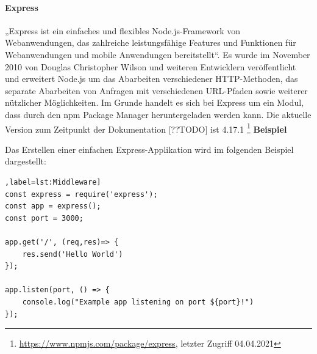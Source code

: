 \paragraph{Express}
„Express ist ein einfaches und flexibles Node.js-Framework von Webanwendungen, das zahlreiche leistungsfähige Features und Funktionen für Webanwendungen und mobile Anwendungen bereitstellt“\cite{Node1.6}.  Es wurde im November 2010 von Douglas Christopher Wilson und weiteren Entwicklern veröffentlicht und erweitert Node.js um das Abarbeiten verschiedener HTTP-Methoden, das separate Abarbeiten von Anfragen mit verschiedenen URL-Pfaden sowie weiterer nützlicher Möglichkeiten. Im Grunde handelt es sich bei Express um ein Modul, dass durch den npm Package Manager heruntergeladen werden kann. Die aktuelle Version zum Zeitpunkt der Dokumentation [??TODO] ist 4.17.1 \footnote{\url{https://www.npmjs.com/package/express}, letzter Zugriff 04.04.2021}
\newline
\newline
\textbf{Beispiel}
 \newline

\noindent
Das Erstellen einer einfachen Express-Applikation wird im folgenden Beispiel dargestellt:\newline

\begin{lstlisting}[caption=Einfacher Webserver [nodejs 1.8],label=lst:Middleware]
const express = require('express');
const app = express();
const port = 3000;

app.get('/', (req,res)=> {
	res.send('Hello World')
});

app.listen(port, () => {
	console.log("Example app listening on port ${port}!")
});
\end{lstlisting}

